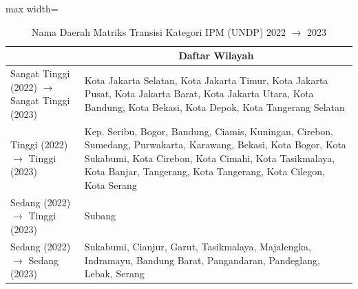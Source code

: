 \begin{table}[H]
\centering
\caption{Nama Daerah Matriks Transisi Kategori IPM (UNDP) 2022 \(\rightarrow\) 2023} \label{tab:app2ipmname2022x2023}
\begin{adjustbox}{max width=\textwidth}
\begin{tabular}{|>{\centering\arraybackslash}p{4cm}|p{10cm}|}
\hline
\multicolumn{1}{|c|}{\textbf{Kategori}} & \multicolumn{1}{c|}{\textbf{Daftar Wilayah}} \\
\hline
Sangat Tinggi (2022) \(\rightarrow\) Sangat Tinggi (2023) & Kota Jakarta Selatan, Kota Jakarta Timur, Kota Jakarta Pusat, Kota Jakarta Barat, Kota Jakarta Utara, Kota Bandung, Kota Bekasi, Kota Depok, Kota Tangerang Selatan \\
\hline
Tinggi (2022) \(\rightarrow\) Tinggi (2023) & Kep. Seribu, Bogor, Bandung, Ciamis, Kuningan, Cirebon, Sumedang, Purwakarta, Karawang, Bekasi, Kota Bogor, Kota Sukabumi, Kota Cirebon, Kota Cimahi, Kota Tasikmalaya, Kota Banjar, Tangerang, Kota Tangerang, Kota Cilegon, Kota Serang \\
\hline
Sedang (2022) \(\rightarrow\) Tinggi (2023) & Subang \\
\hline
Sedang (2022) \(\rightarrow\) Sedang (2023) & Sukabumi, Cianjur, Garut, Tasikmalaya, Majalengka, Indramayu, Bandung Barat, Pangandaran, Pandeglang, Lebak, Serang \\
\hline
\end{tabular}
\end{adjustbox}
\end{table}